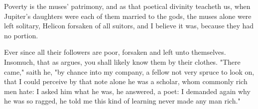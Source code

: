 
Poverty is the muses' patrimony, and as that poetical divinity teacheth us,
when Jupiter's daughters were each of them married to the gods, the muses alone
were left solitary, Helicon forsaken of all suitors, and I believe it was,
because they had no portion.

%

Ever since all their followers are poor, forsaken and left unto themselves.
Insomuch, that as \Petronius argues, you shall likely know
them by their clothes. "There came," saith he, "by chance into my company, a
fellow not very spruce to look on, that I could perceive by that note alone he
was a scholar, whom commonly rich men hate: I asked him what he was, he
answered, a poet: I demanded again why he was so ragged, he told me this kind
of learning never made any man rich."

